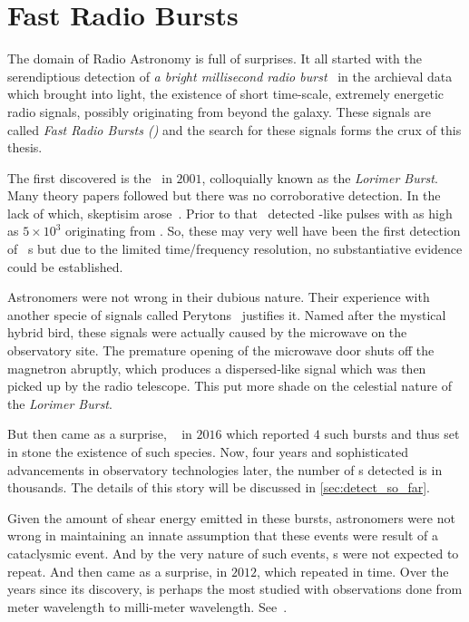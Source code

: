 \chapter{Fast Radio Bursts}\label{ch:frb}

\par The domain of Radio Astronomy is full of surprises. 
It all started with the serendiptious detection of \emph{a bright millisecond radio burst}~\cite{first_frb} in the archieval data which brought into light, the existence of short time-scale, extremely energetic radio signals, possibly originating from beyond the galaxy. 
These signals are called \emph{Fast Radio Bursts (\frb{})} and the search for these signals forms the crux of this thesis.

\par The first discovered \frb is the~\cite{lorimerburst} in $2001$, colloquially known as the \emph{Lorimer Burst}. 
Many theory papers followed but there was no corroborative detection. In the lack of which, skeptisim arose~\cite{burke_doubt}. 
Prior to that~\cite{old_m87_bursts} detected \frb-like pulses with \dm as high as $5\times 10^3$ \pc originating from . So, these may very well have been the first detection of \frb~s but due to the limited time/frequency resolution, no substantiative evidence could be established. 

\par Astronomers were not wrong in their dubious nature. Their experience with another specie of signals called Perytons~\cite{perytons} justifies it. Named after the mystical hybrid bird, these signals were actually caused by the microwave on the observatory site. The premature opening of the microwave door shuts off the magnetron abruptly, which produces a dispersed-like signal which was then picked up by the radio telescope.
This put more shade on the celestial nature of the \emph{Lorimer Burst}.

\par But then came as a surprise, ~\cite{danburst4} in $2016$ which reported $4$ such bursts and thus set in stone the existence of such species. 
Now, four years and sophisticated advancements in observatory technologies later, the number of \frb{}s detected is in thousands. The details of this story will be discussed in \autoref{sec:detect_so_far}.

\par Given the amount of shear energy emitted in these bursts, astronomers were not wrong in maintaining an innate assumption that these events were result of a cataclysmic event. And by the very nature of such events, \frb{}s were not expected to repeat. And then came as a surprise,  in $2012$, which repeated in time.
Over the years since its discovery,  is perhaps the most studied \frb{} with observations done from meter wavelength to milli-meter wavelength. See~\cite{sptlier}.

